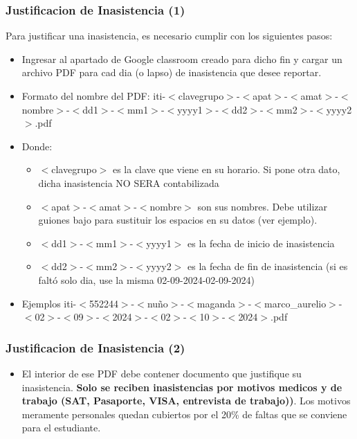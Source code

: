 \begin{frame}
\frametitle{Justificacion de Inasistencia (1)}
Para justificar una inasistencia, es necesario cumplir con los siguientes pasos:
\begin{itemize}	 
\item Ingresar al apartado de Google classroom creado para dicho fin y cargar un archivo PDF para cad dia (o lapso) de inasistencia que desee reportar. 
\item Formato del nombre del PDF:
\tiny
iti-$<$clavegrupo$>$-$<$apat$>$-$<$amat$>$-$<$nombre$>$-$<$dd1$>$-$<$mm1$>$-$<$yyyy1$>$-$<$dd2$>$-$<$mm2$>$-$<$yyyy2$>$.pdf
\normalsize
\item Donde:
\begin{itemize}
\item \tiny{$<$clavegrupo$>$} es la clave que viene en su horario.  Si pone otra dato, dicha inasistencia NO SERA contabilizada
\item \tiny{$<$apat$>$-$<$amat$>$-$<$nombre$>$} son sus nombres.  Debe utilizar guiones bajo para sustituir los espacios en su datos (ver ejemplo). 
\item \tiny{$<$dd1$>$-$<$mm1$>$-$<$yyyy1$>$} es la fecha de inicio de inasistencia 
\item \tiny{$<$dd2$>$-$<$mm2$>$-$<$yyyy2$>$} es la fecha de fin de inasistencia (si es faltó solo dia, use la misma 02-09-2024-02-09-2024)
\end{itemize}
\item Ejemplos
\tiny
iti-$<$552244$>$-$<$nuño$>$-$<$maganda$>$-$<$marco\_aurelio$>$-$<$02$>$-$<$09$>$-$<$2024$>$-$<$02$>$-$<$10$>$-$<$2024$>$.pdf
\normalsize
\end{itemize}
\end{frame}

\begin{frame}
\frametitle{Justificacion de Inasistencia (2)}
\begin{itemize}
\item El interior de ese PDF debe contener documento que justifique su inasistencia. \textbf{Solo se reciben inasistencias por motivos medicos y de trabajo (SAT, Pasaporte, VISA, entrevista de trabajo))}. Los motivos meramente personales quedan cubiertos por el 20\% de faltas que se conviene para el estudiante.  

\end{itemize}


\end{frame}




